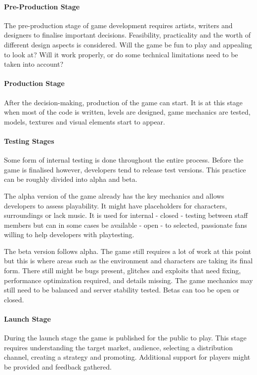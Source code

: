 \paragraph{Pre-Production Stage}
The pre-production stage of game development requires artists, writers and designers to finalise important decisions. Feasibility, practicality and the worth of different design aspects is considered. Will the game be fun to play and appealing to look at? Will it work properly, or do some technical limitations need to be taken into account?

\paragraph{Production Stage}
After the decision-making, production of the game can start. It is at this stage when most of the code is written, levels are designed, game mechanics are tested, models, textures and visual elements start to appear.

\paragraph{Testing Stages}
Some form of internal testing is done throughout the entire process. Before the game is finalised however, developers tend to release test versions. This practice can be roughly divided into alpha and beta.

The alpha version of the game already has the key mechanics and allows developers to assess playability. It might have placeholders for characters, surroundings or lack music. It is used for internal - closed - testing between staff members but can in some cases be available - open - to selected, passionate fans willing to help developers with playtesting.

The beta version follows alpha. The game still requires a lot of work at this point but this is where areas such as the environment and characters are taking its final form. There still might be bugs present, glitches and exploits that need fixing, performance optimization required, and details missing. The game mechanics may still need to be balanced and server stability tested. Betas can too be open or closed.

\paragraph{Launch Stage}
During the launch stage the game is published for the public to play. This stage requires understanding the target market, audience, selecting a distribution channel, creating a strategy and promoting. Additional support for players might be provided and feedback gathered.

